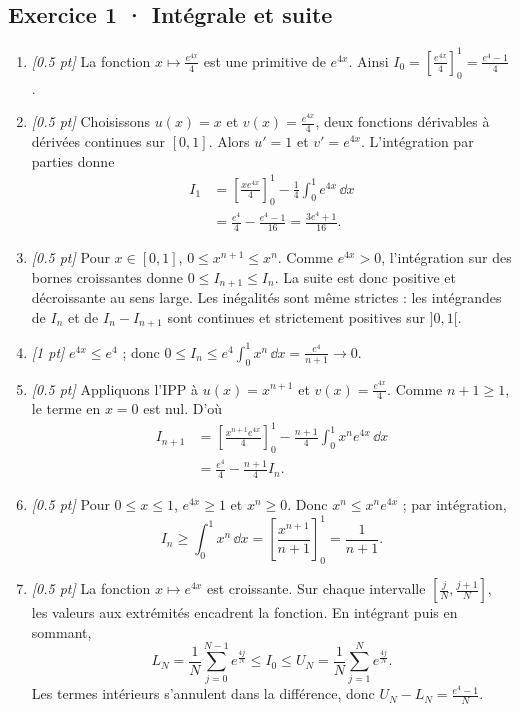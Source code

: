 \subsection*{Exercice 1 · Intégrale et suite}\begin{enumerate}

\item \textit{[\num{0,5} pt]} La fonction $x\mapsto \frac{e^{4x}}{4}$ est une primitive de $e^{4x}$. Ainsi $I_0=[\frac{e^{4x}}{4}]_0^1=\frac{e^{4}-1}{4}$.

\item \textit{[\num{0,5} pt]} Choisissons $u(x)=x$ et $v(x)=\frac{e^{4x}}{4}$, deux fonctions dérivables à dérivées continues sur $[0,1]$. Alors $u'=1$ et $v'=e^{4x}$. L'intégration par parties donne
\[\begin{aligned}I_1&=\left[\frac{xe^{4x}}{4}\right]_0^1-\frac{1}{4}\int_0^1e^{4x}\,\dd x\\&=\frac{e^{4}}{4}-\frac{e^{4}-1}{16}=\frac{3e^{4}+1}{16}.\end{aligned}\]

\item \textit{[\num{0,5} pt]} Pour $x\in[0,1]$, $0\le x^{n+1}\le x^n$. Comme $e^{4x}>0$, l'intégration sur des bornes croissantes donne $0\le I_{n+1}\le I_n$. La suite est donc positive et décroissante au sens large. Les inégalités sont même strictes : les intégrandes de $I_n$ et de $I_n-I_{n+1}$ sont continues et strictement positives sur $]0,1[$.

\item \textit{[1 pt]} $e^{4x}\le e^{4}$ ; donc $0\le I_n\le e^{4}\int_0^1x^n\,\dd x=\frac{e^{4}}{n+1}\to0$.

\item \textit{[\num{0,5} pt]} Appliquons l'IPP à $u(x)=x^{n+1}$ et $v(x)=\frac{e^{4x}}{4}$. Comme $n+1\ge1$, le terme en $x=0$ est nul. D'où
\[\begin{aligned}I_{n+1}&=\left[\frac{x^{n+1}e^{4x}}{4}\right]_0^1-\frac{n+1}{4}\int_0^1x^ne^{4x}\,\dd x\\&=\frac{e^{4}}{4}-\frac{n+1}{4}I_n.\end{aligned}\]

\item \textit{[\num{0,5} pt]} Pour $0\le x\le1$, $e^{4x}\ge1$ et $x^n\ge0$. Donc $x^n\le x^ne^{4x}$ ; par intégration,
\[I_n\ge\int_0^1x^n\,\dd x=\left[\frac{x^{n+1}}{n+1}\right]_0^1=\frac{1}{n+1}.\]

\item \textit{[\num{0,5} pt]} La fonction $x\mapsto e^{4x}$ est croissante. Sur chaque intervalle $[\frac{j}{N},\frac{j+1}{N}]$, les valeurs aux extrémités encadrent la fonction. En intégrant puis en sommant,
\[L_N=\frac{1}{N}\sum_{j=0}^{N-1}e^{\frac{4j}{N}}\le I_0\le U_N=\frac{1}{N}\sum_{j=1}^Ne^{\frac{4j}{N}}.\]
Les termes intérieurs s'annulent dans la différence, donc $U_N-L_N=\frac{e^{4}-1}{N}$.


\end{enumerate}
